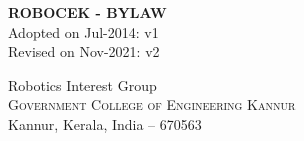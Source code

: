 \begin{titlepage}
	\clearpage
	\vspace*{\fill}
	\thispagestyle{empty}
	\begin{onehalfspace}
		\begin{center}
			
			\textup{\huge{\bf ROBOCEK - BYLAW}}
			\\[0.3in]

			Adopted on Jul-2014: v1\\
			Revised on Nov-2021: v2

			
			\vfill
			
			\begin{center}
			\end{center}
			
			\Large{Robotics Interest Group}\\
			\normalsize \textsc{Government College of Engineering Kannur}\\ Kannur, Kerala, India -- 670563 \\
			\vspace{0.2cm}
			
		\end{center}
	\end{onehalfspace}
	\vspace*{\fill}
\end{titlepage}
